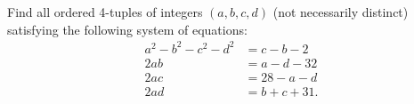 Find all ordered 4-tuples of integers $(a,b,c,d)$ (not necessarily distinct) satisfying the following system of equations: \begin{align*}a^2-b^2-c^2-d^2&=c-b-2\\2ab&=a-d-32\\2ac&=28-a-d\\2ad&=b+c+31.\end{align*}